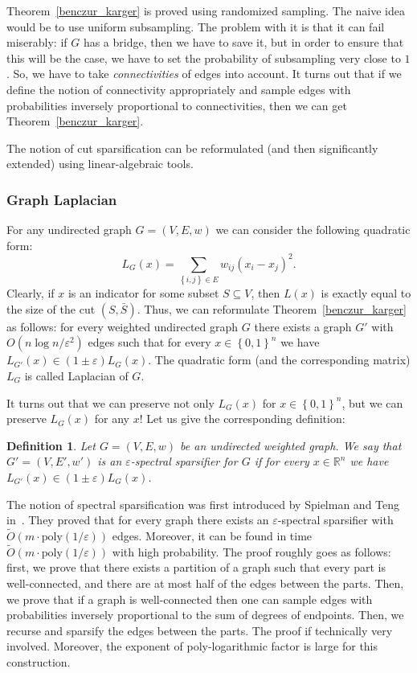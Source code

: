 \documentclass[12pt]{article}
\newcommand{\Rbb}{\mathbb{R}}
\newcommand{\eps}{\varepsilon}
\newcommand{\set}[1]{\left\{#1\right\}}
\newtheorem{definition}{Definition}
\begin{document}
    Theorem~\ref{benczur_karger} is proved using randomized sampling. The naive idea would
    be to use uniform subsampling. The problem with it is that it can fail miserably:
    if $G$ has a bridge, then we have to save it, but in order to ensure that this will be
    the case, we have to set the probability of subsampling very close to $1$.
    So, we have to take \emph{connectivities} of edges into account.
    It turns out that if we define the notion of connectivity appropriately and sample
    edges with probabilities inversely proportional to connectivities, then we can get
    Theorem~\ref{benczur_karger}.

    The notion of cut sparsification can be reformulated (and then significantly extended)
    using linear-algebraic tools.
    \subsubsection{Graph Laplacian}
    For any undirected graph $G = (V, E, w)$ we can consider the following quadratic
    form:
    $$
        L_G(x) = \sum_{\set{i, j} \in E} w_{ij} (x_i - x_j)^2.
    $$
    Clearly, if $x$ is an indicator for some subset $S \subseteq V$, then $L(x)$
    is exactly equal to the size of the cut $(S, \bar{S})$.
    Thus, we can reformulate Theorem~\ref{benczur_karger} as follows: for every weighted
    undirected graph $G$ there exists a graph $G'$ with $O(n \log n / \eps^2)$ edges such
    that for every $x \in \set{0, 1}^n$ we have $L_{G'}(x) \in (1 \pm \eps) L_G(x)$.
    The quadratic form (and the corresponding matrix) $L_G$ is called Laplacian of $G$.

    It turns out that we can preserve not only $L_G(x)$ for $x \in \set{0, 1}^n$, but
    we can preserve $L_G(x)$ for any $x$! Let us give the corresponding definition:
    \begin{definition}
        Let $G = (V, E, w)$ be an undirected weighted graph.
        We say that $G' = (V, E', w')$ is an $\eps$-spectral sparsifier
        for $G$ if for every $x \in \Rbb^n$ we have $L_{G'}(x) \in (1 \pm \eps) L_G(x)$.
    \end{definition}

    The notion of spectral sparsification was first introduced by Spielman and Teng
    in~\cite{ST11}. They proved that for every graph there exists an $\eps$-spectral
    sparsifier with $\tilde{O}(m \cdot \mathrm{poly}(1 / \eps))$ edges.
    Moreover, it can be found in time $\tilde{O}(m \cdot \mathrm{poly}(1 / \eps))$
    with high probability.
    The proof roughly goes as follows: first, we prove that there exists a partition of
    a graph such that every part is well-connected, and there are at most half of the
    edges between the parts. Then, we prove that if a graph is well-connected then
    one can sample edges with probabilities inversely proportional to the sum of degrees
    of endpoints. Then, we recurse and sparsify the edges between the parts.
    The proof if technically very involved.
    Moreover, the exponent of poly-logarithmic factor is large for this
    construction.
\end{document}

